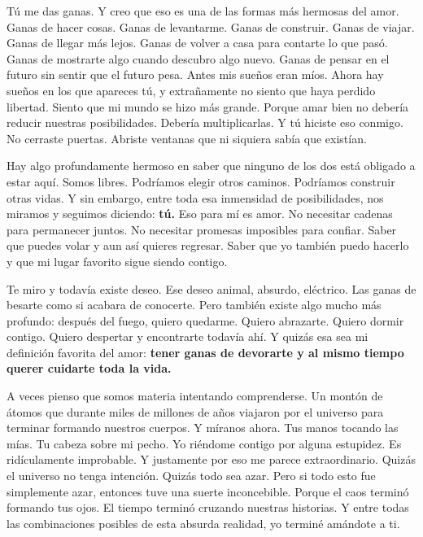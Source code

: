 \documentclass[10pt,twocolumn]{article}
\begin{document}
\begin{list}{}{\setlength{\leftmargin}{2.4cm}\setlength{\rightmargin}{2.4cm}\setlength{\topsep}{0pt}\setlength{\partopsep}{0pt}}
Tú me das ganas. Y creo que eso es una de las formas más hermosas del amor. Ganas de hacer cosas. Ganas de levantarme. Ganas de construir. Ganas de viajar. Ganas de llegar más lejos. Ganas de volver a casa para contarte lo que pasó. Ganas de mostrarte algo cuando descubro algo nuevo. Ganas de pensar en el futuro sin sentir que el futuro pesa. Antes mis sueños eran míos. Ahora hay sueños en los que apareces tú, y extrañamente no siento que haya perdido libertad. Siento que mi mundo se hizo más grande. Porque amar bien no debería reducir nuestras posibilidades. Debería multiplicarlas. Y tú hiciste eso conmigo. No cerraste puertas. Abriste ventanas que ni siquiera sabía que existían.

Hay algo profundamente hermoso en saber que ninguno de los dos está obligado a estar aquí. Somos libres. Podríamos elegir otros caminos. Podríamos construir otras vidas. Y sin embargo, entre toda esa inmensidad de posibilidades, nos miramos y seguimos diciendo: \textbf{tú.} Eso para mí es amor. No necesitar cadenas para permanecer juntos. No necesitar promesas imposibles para confiar. Saber que puedes volar y aun así quieres regresar. Saber que yo también puedo hacerlo y que mi lugar favorito sigue siendo contigo.

Te miro y todavía existe deseo. Ese deseo animal, absurdo, eléctrico. Las ganas de besarte como si acabara de conocerte. Pero también existe algo mucho más profundo: después del fuego, quiero quedarme. Quiero abrazarte. Quiero dormir contigo. Quiero despertar y encontrarte todavía ahí. Y quizás esa sea mi definición favorita del amor: \textbf{tener ganas de devorarte y al mismo tiempo querer cuidarte toda la vida.}

A veces pienso que somos materia intentando comprenderse. Un montón de átomos que durante miles de millones de años viajaron por el universo para terminar formando nuestros cuerpos. Y míranos ahora. Tus manos tocando las mías. Tu cabeza sobre mi pecho. Yo riéndome contigo por alguna estupidez. Es ridículamente improbable. Y justamente por eso me parece extraordinario. Quizás el universo no tenga intención. Quizás todo sea azar. Pero si todo esto fue simplemente azar, entonces tuve una suerte inconcebible. Porque el caos terminó formando tus ojos. El tiempo terminó cruzando nuestras historias. Y entre todas las combinaciones posibles de esta absurda realidad, yo terminé amándote a ti.



\end{list}
\end{document}
